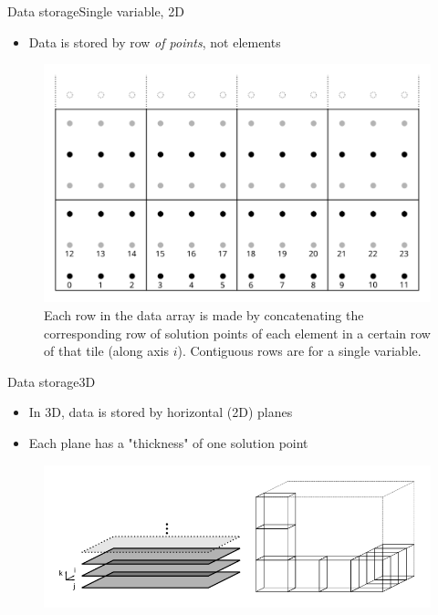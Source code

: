 \documentclass{beamer}
\begin{document}
\begin{frame}{Data storage}{Single variable, 2D}
\begin{itemize}
    \item Data is stored by row \emph{of points}, not elements
\end{itemize}
\begin{figure}
    \includegraphics[scale=0.7]{img/variable_storage}
    \caption{Each row in the data array is made by concatenating the corresponding row of solution points of
             each element in a certain row of that tile (along axis $i$). Contiguous rows are for a single variable.}
\end{figure}
\end{frame}

\begin{frame}{Data storage}{3D}
\begin{itemize}
    \item In 3D, data is stored by horizontal (2D) planes
    \item Each plane has a "thickness" of one solution point
\end{itemize}
\begin{figure}
    \includegraphics[scale=1.1]{img/3d_storage}
\end{figure}
\end{frame}
\end{document}
